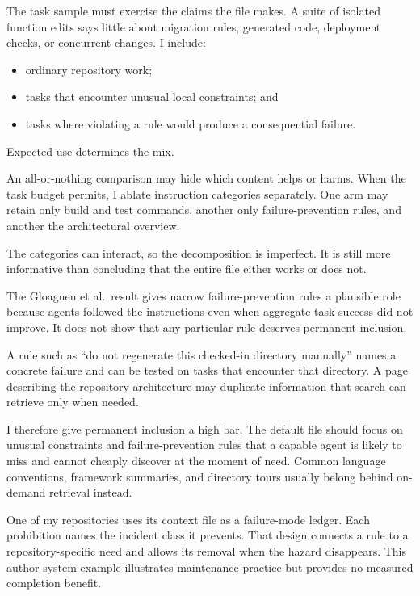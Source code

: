 The task sample must exercise the claims the file makes. A suite of isolated function edits says little about migration rules, generated code, deployment checks, or concurrent changes. I include:

\begin{itemize}
\tightlist
\item
  ordinary repository work;
\item
  tasks that encounter unusual local constraints; and
\item
  tasks where violating a rule would produce a consequential failure.
\end{itemize}

Expected use determines the mix.

An all-or-nothing comparison may hide which content helps or harms. When the task budget permits, I ablate instruction categories separately. One arm may retain only build and test commands, another only failure-prevention rules, and another the architectural overview.

The categories can interact, so the decomposition is imperfect. It is still more informative than concluding that the entire file either works or does not.

The Gloaguen et al.~result gives narrow failure-prevention rules a plausible role because agents followed the instructions even when aggregate task success did not improve. It does not show that any particular rule deserves permanent inclusion.

A rule such as ``do not regenerate this checked-in directory manually'' names a concrete failure and can be tested on tasks that encounter that directory. A page describing the repository architecture may duplicate information that search can retrieve only when needed.

I therefore give permanent inclusion a high bar. The default file should focus on unusual constraints and failure-prevention rules that a capable agent is likely to miss and cannot cheaply discover at the moment of need. Common language conventions, framework summaries, and directory tours usually belong behind on-demand retrieval instead.

One of my repositories uses its context file as a failure-mode ledger. Each prohibition names the incident class it prevents. That design connects a rule to a repository-specific need and allows its removal when the hazard disappears. This author-system example illustrates maintenance practice but provides no measured completion benefit.

